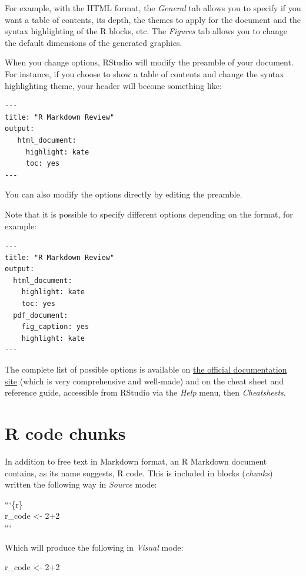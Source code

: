 \documentclass[
  letterpaper,
  DIV=11,
  numbers=noendperiod]{scrreprt}
\newenvironment{Shaded}{\begin{snugshade}}{\end{snugshade}}
\newcommand{\DecValTok}[1]{\textcolor[rgb]{0.68,0.00,0.00}{#1}}
\newcommand{\NormalTok}[1]{\textcolor[rgb]{0.00,0.23,0.31}{#1}}
\newcommand{\OtherTok}[1]{\textcolor[rgb]{0.00,0.23,0.31}{#1}}
\newcommand{\SpecialCharTok}[1]{\textcolor[rgb]{0.37,0.37,0.37}{#1}}
\begin{document}
For example, with the HTML format, the \emph{General} tab allows you to
specify if you want a table of contents, its depth, the themes to apply
for the document and the syntax highlighting of the R blocks, etc. The
\emph{Figures} tab allows you to change the default dimensions of the
generated graphics.

When you change options, RStudio will modify the preamble of your
document. For instance, if you choose to show a table of contents and
change the syntax highlighting theme, your header will become something
like:

\begin{verbatim}
---
title: "R Markdown Review"
output:
   html_document:
     highlight: kate
     toc: yes
---
\end{verbatim}

You can also modify the options directly by editing the preamble.

Note that it is possible to specify different options depending on the
format, for example:

\begin{verbatim}
---
title: "R Markdown Review"
output:
  html_document:
    highlight: kate
    toc: yes
  pdf_document:
    fig_caption: yes
    highlight: kate
---
\end{verbatim}

The complete list of possible options is available on
\href{http://rmarkdown.rstudio.com/formats.html}{the official
documentation site} (which is very comprehensive and well-made) and on
the cheat sheet and reference guide, accessible from RStudio via the
\emph{Help} menu, then \emph{Cheatsheets}.

\hypertarget{r-code-chunks}{%
\section{R code chunks}\label{r-code-chunks}}

In addition to free text in Markdown format, an R Markdown document
contains, as its name suggests, R code. This is included in blocks
(\emph{chunks}) written the following way in \emph{Source} mode:

```\{r\}\\
r\_code \textless- 2+2\\
```

Which will produce the following in \emph{Visual} mode:

\begin{Shaded}
\begin{Highlighting}[]
\NormalTok{r\_code }\OtherTok{\textless{}{-}} \DecValTok{2}\SpecialCharTok{+}\DecValTok{2}
\end{Highlighting}
\end{Shaded}
\end{document}
